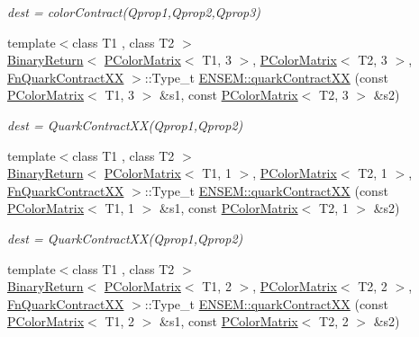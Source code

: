 \begin{DoxyCompactItemize}
\begin{DoxyCompactList}\small\item\em dest = color\+Contract(\+Qprop1,\+Qprop2,\+Qprop3) \end{DoxyCompactList}\item 
{\footnotesize template$<$class T1 , class T2 $>$ }\\\mbox{\hyperlink{structENSEM_1_1BinaryReturn}{Binary\+Return}}$<$ \mbox{\hyperlink{classENSEM_1_1PColorMatrix}{P\+Color\+Matrix}}$<$ T1, 3 $>$, \mbox{\hyperlink{classENSEM_1_1PColorMatrix}{P\+Color\+Matrix}}$<$ T2, 3 $>$, \mbox{\hyperlink{structENSEM_1_1FnQuarkContractXX}{Fn\+Quark\+Contract\+XX}} $>$\+::Type\+\_\+t \mbox{\hyperlink{group__primcolormatrix_ga2253a81d9cf66ad41a9c2426ef5a8b84}{E\+N\+S\+E\+M\+::quark\+Contract\+XX}} (const \mbox{\hyperlink{classENSEM_1_1PColorMatrix}{P\+Color\+Matrix}}$<$ T1, 3 $>$ \&s1, const \mbox{\hyperlink{classENSEM_1_1PColorMatrix}{P\+Color\+Matrix}}$<$ T2, 3 $>$ \&s2)
\begin{DoxyCompactList}\small\item\em dest = Quark\+Contract\+X\+X(\+Qprop1,\+Qprop2) \end{DoxyCompactList}\item 
{\footnotesize template$<$class T1 , class T2 $>$ }\\\mbox{\hyperlink{structENSEM_1_1BinaryReturn}{Binary\+Return}}$<$ \mbox{\hyperlink{classENSEM_1_1PColorMatrix}{P\+Color\+Matrix}}$<$ T1, 1 $>$, \mbox{\hyperlink{classENSEM_1_1PColorMatrix}{P\+Color\+Matrix}}$<$ T2, 1 $>$, \mbox{\hyperlink{structENSEM_1_1FnQuarkContractXX}{Fn\+Quark\+Contract\+XX}} $>$\+::Type\+\_\+t \mbox{\hyperlink{group__primcolormatrix_gadb40ddb5edfab27bf7bb4b8cd7430ad6}{E\+N\+S\+E\+M\+::quark\+Contract\+XX}} (const \mbox{\hyperlink{classENSEM_1_1PColorMatrix}{P\+Color\+Matrix}}$<$ T1, 1 $>$ \&s1, const \mbox{\hyperlink{classENSEM_1_1PColorMatrix}{P\+Color\+Matrix}}$<$ T2, 1 $>$ \&s2)
\begin{DoxyCompactList}\small\item\em dest = Quark\+Contract\+X\+X(\+Qprop1,\+Qprop2) \end{DoxyCompactList}\item 
{\footnotesize template$<$class T1 , class T2 $>$ }\\\mbox{\hyperlink{structENSEM_1_1BinaryReturn}{Binary\+Return}}$<$ \mbox{\hyperlink{classENSEM_1_1PColorMatrix}{P\+Color\+Matrix}}$<$ T1, 2 $>$, \mbox{\hyperlink{classENSEM_1_1PColorMatrix}{P\+Color\+Matrix}}$<$ T2, 2 $>$, \mbox{\hyperlink{structENSEM_1_1FnQuarkContractXX}{Fn\+Quark\+Contract\+XX}} $>$\+::Type\+\_\+t \mbox{\hyperlink{group__primcolormatrix_gaeaaf0956a43ba474c9f772480094c1f5}{E\+N\+S\+E\+M\+::quark\+Contract\+XX}} (const \mbox{\hyperlink{classENSEM_1_1PColorMatrix}{P\+Color\+Matrix}}$<$ T1, 2 $>$ \&s1, const \mbox{\hyperlink{classENSEM_1_1PColorMatrix}{P\+Color\+Matrix}}$<$ T2, 2 $>$ \&s2)

\end{DoxyCompactItemize}
